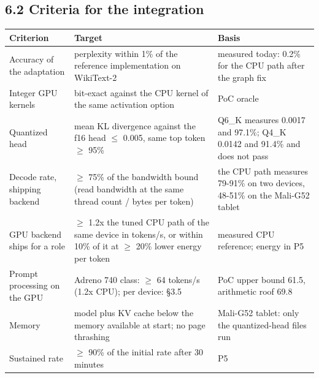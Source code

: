 \documentclass[
  10pt,
]{article}
\newcounter{none} %
\begin{document}
\subsection{6.2 Criteria for the
integration}\label{criteria-for-the-integration}

{\def\LTcaptype{none} %
\begin{longtable}[]{@{}
  >{\raggedright\arraybackslash}p{}
  >{\raggedright\arraybackslash}p{}
  >{\raggedright\arraybackslash}p{}@{}}
\toprule\noalign{}
\begin{minipage}[b]{\linewidth}\raggedright%
Criterion
\end{minipage} & \begin{minipage}[b]{\linewidth}\raggedright%
Target
\end{minipage} & \begin{minipage}[b]{\linewidth}\raggedright%
Basis
\end{minipage} \\
\midrule\noalign{}
\endhead%
\bottomrule\noalign{}
\endlastfoot%
Accuracy of the adaptation & perplexity within 1\% of the reference
implementation on WikiText-2 & measured today: 0.2\% for the CPU path
after the graph fix \\
Integer GPU kernels & bit-exact against the CPU kernel of the same
activation option & PoC oracle \\
Quantized head & mean KL divergence against the f16 head $\leq$ 0.005, same
top token $\geq$ 95\% & Q6\_K measures 0.0017 and 97.1\%; Q4\_K 0.0142 and
91.4\% and does not pass \\
Decode rate, shipping backend & $\geq$ 75\% of the bandwidth bound (read
bandwidth at the same thread count / bytes per token) & the CPU path
measures 79-91\% on two devices, 48-51\% on the Mali-G52 tablet \\
GPU backend ships for a role & $\geq$ 1.2x the tuned CPU path of the same
device in tokens/s, or within 10\% of it at $\geq$ 20\% lower energy per
token & measured CPU reference; energy in P5 \\
Prompt processing on the GPU & Adreno 740 class: $\geq$ 64 tokens/s (1.2x
CPU); per device: \S{}3.5 & PoC upper bound 61.5, arithmetic roof 69.8 \\
Memory & model plus KV cache below the memory available at start; no
page thrashing & Mali-G52 tablet: only the quantized-head files run \\
Sustained rate & $\geq$ 90\% of the initial rate after 30 minutes & P5 \\
\end{longtable}
}
\end{document}
